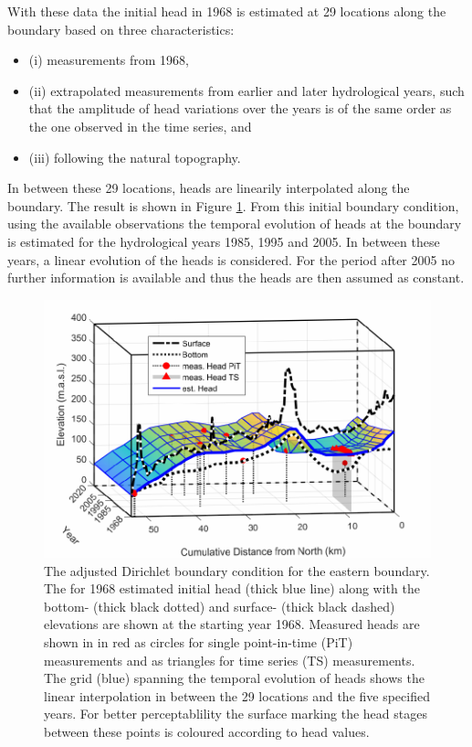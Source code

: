 With these data the initial head in 1968 is estimated at 29 locations along the boundary based on three characteristics:
    \begin{itemize}
        \item (i) measurements from 1968,
        \item (ii) extrapolated measurements from earlier and later hydrological years, such that the amplitude of head variations over the years is of the same order as the one observed in the time series, and
        \item (iii) following the natural topography.
    \end{itemize}

In between these 29 locations, heads are linearily interpolated along the boundary. 
The result is shown in Figure \ref{Fig-EastB}. 
From this initial boundary condition, using the available observations the temporal evolution of heads at the boundary is estimated for the hydrological years 1985, 1995 and 2005. 
In between these years, a linear evolution of the heads is considered. 
For the period after 2005 no further information is available and thus the heads are then assumed as constant.

\begin{figure}[h]
    \centering
    \includegraphics{./img/Fig-EasternBoundary.pdf}
    \captionsetup{format=hang, labelfont=bf, textfont=it}
    \caption{The adjusted Dirichlet boundary condition for the eastern boundary. The for 1968 estimated initial head (thick blue line) along with the bottom- (thick black dotted) and surface- (thick black dashed) elevations are shown at the starting year 1968. Measured heads are shown in in red as circles for single point-in-time (PiT) measurements and as triangles for time series (TS) measurements. The grid (blue) spanning the temporal evolution of heads shows the linear interpolation in between the 29 locations and the five specified years. For better perceptablility the surface marking the head stages between these points is coloured according to head values.}
    \label{Fig-EastB}
\end{figure}

